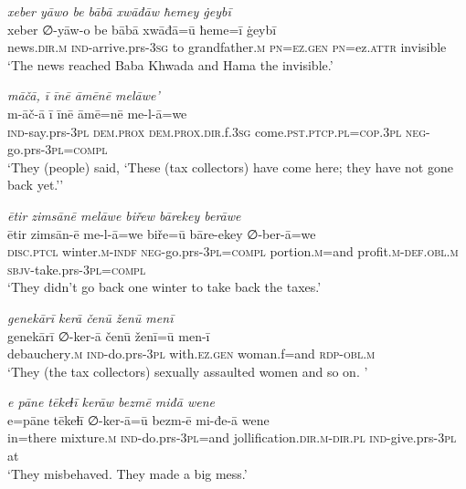 \ea \label{BP.46}
\textit{xeber yāwo be bābā xwāđāw ħemey ġeybī} \\ 
\gll xeber ∅-yāw-o be bābā xwāđā=ū ħeme=ī ġeybī \\ 
 news\textsc{.dir}\textsc{.m} \textsc{ind-}arrive.prs\textsc{-3sg} to grandfather\textsc{.m} \textsc{pn}\textsc{=ez.gen} \textsc{pn}=ez.\textsc{attr} invisible \\ 
\glt `The news reached Baba Khwada and Hama the invisible.'
\z 
 
\ea \label{BP.47}
\textit{māčā, ī īnē āmēnē melāwe’} \\ 
\gll m-āč-ā ī īnē āmē=nē me-l-ā=we \\ 
 \textsc{ind-}say.prs\textsc{-3pl} \textsc{dem.prox} \textsc{dem.prox}\textsc{.dir}.f\textsc{.3sg} come\textsc{.pst}\textsc{.ptcp}\textsc{.pl}\textsc{=cop}\textsc{.3pl} \textsc{neg-}go.prs\textsc{-3pl}\textsc{=compl} \\ 
\glt `They (people) said, ‘These (tax collectors) have come here; they have not gone back yet.’'
\z 
 
\ea \label{BP.48}
\textit{ētir zimsānē melāwe biřew bārekey berāwe} \\ 
\gll ētir zimsān-ē me-l-ā=we biře=ū bāre-ekey ∅-ber-ā=we \\ 
 \textsc{disc.ptcl} winter\textsc{.m}\textsc{-indf} \textsc{neg-}go.prs\textsc{-3pl}\textsc{=compl} portion\textsc{.m}=and profit\textsc{.m}\textsc{-def}\textsc{.obl}\textsc{.m} \textsc{sbjv-}take.prs\textsc{-3pl}\textsc{=compl} \\ 
\glt `They didn’t go back one winter to take back the taxes.'
\z 
 
\ea \label{BP.49}
\textit{genekārī kerā čenū ženū menī} \\ 
\gll genekārī ∅-ker-ā čenū ženī=ū men-ī \\ 
 debauchery\textsc{.m} \textsc{ind-}do.prs\textsc{-3pl} with\textsc{.ez.gen} woman.f=and \textsc{rdp}\textsc{-obl}\textsc{.m} \\ 
\glt `They (the tax collectors) sexually assaulted women and so on. '
\z 
 
\ea \label{BP.50}
\textit{e pāne tēkeɫī kerāw bezmē miđā wene} \\ 
\gll e=pāne tēkeɫī ∅-ker-ā=ū bezm-ē mi-đe-ā wene \\ 
 in=there mixture\textsc{.m} \textsc{ind-}do.prs\textsc{-3pl}=and jollification\textsc{.dir}\textsc{.m}\textsc{-dir}\textsc{.pl} \textsc{ind-}give.prs\textsc{-3pl} at \\ 
\glt `They misbehaved. They made a big mess.'
\z 
 
